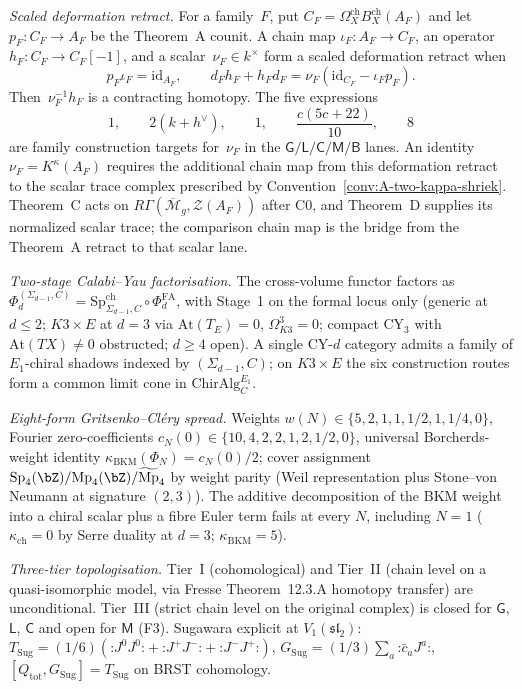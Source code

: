 \emph{Scaled deformation retract.}  For a family~$F$, put
$C_F=\Omega_X^{\mathrm{ch}}B_X^{\mathrm{ch}}(A_F)$ and let
$p_F\colon C_F\to A_F$ be the Theorem~A counit.  A chain map
$\iota_F\colon A_F\to C_F$, an operator
$h_F\colon C_F\to C_F[-1]$, and a scalar~$\nu_F\in k^\times$ form a
scaled deformation retract when
\[
 p_F\iota_F=\mathrm{id}_{A_F},
 \qquad
 d_Fh_F+h_Fd_F
 =\nu_F(\mathrm{id}_{C_F}-\iota_Fp_F).
\]
Then~$\nu_F^{-1}h_F$ is a contracting homotopy.  The five expressions
\[
 1,\qquad 2(k+h^\vee),\qquad 1,\qquad
 \frac{c(5c+22)}{10},\qquad 8
\]
are family construction targets for~$\nu_F$ in the
$\mathsf G/\mathsf L/\mathsf C/\mathsf M/\mathsf B$ lanes.  An identity
$\nu_F=K^\kappa(A_F)$ requires the additional chain map from this
deformation retract to the scalar trace complex prescribed by
Convention~\ref{conv:A-two-kappa-shriek}.  Theorem~C acts on
$R\Gamma(\overline{\mathcal M}_g,\mathcal Z(A_F))$ after C0, and
Theorem~D supplies its normalized scalar trace; the comparison chain
map is the bridge from the Theorem~A retract to that scalar lane.

\emph{Two-stage Calabi--Yau factorisation.} The cross-volume functor
factors as
$\Phi_d^{(\Sigma_{d-1},C)}
= \mathrm{Sp}^{\mathrm{ch}}_{\Sigma_{d-1},C}\circ\Phi^{\mathrm{FA}}_d$,
with Stage~1 on the formal locus only (generic at $d\le 2$;
$K3\times E$ at $d=3$ via $\mathrm{At}(T_E)=0$, $\Omega^3_{K3}=0$;
compact CY$_3$ with $\mathrm{At}(TX)\neq 0$ obstructed; $d\ge 4$
open). A single CY-$d$ category admits a family of $E_1$-chiral
shadows indexed by $(\Sigma_{d-1},C)$; on $K3\times E$ the six
construction routes form a common limit cone in
$\mathrm{ChirAlg}^{E_1}_C$.

\emph{Eight-form Gritsenko--Cl\'ery spread.} Weights
$w(N)\in\{5,2,1,1,1/2,1,1/4,0\}$, Fourier zero-coefficients
$c_N(0)\in\{10,4,2,2,1,2,1/2,0\}$, universal Borcherds-weight
identity $\kappa_{\mathrm{BKM}}(\Phi_N)=c_N(0)/2$; cover assignment
$\mathrm{Sp}_4(\bZ)/\mathrm{Mp}_4(\bZ)/\widetilde{\mathrm{Mp}}_4$ by
weight parity (Weil representation plus Stone--von Neumann at
signature $(2,3)$). The additive decomposition of the BKM weight
into a chiral scalar plus a fibre Euler term fails at every $N$,
including $N=1$ ($\kappa_{\mathrm{ch}}=0$ by Serre duality at
$d=3$; $\kappa_{\mathrm{BKM}}=5$).

\emph{Three-tier topologisation.} Tier~I (cohomological) and
Tier~II (chain level on a quasi-isomorphic model, via Fresse
Theorem~12.3.A homotopy transfer) are unconditional. Tier~III
(strict chain level on the original complex) is closed for
$\mathsf G$, $\mathsf L$, $\mathsf C$ and open for $\mathsf M$ (F3).
Sugawara explicit at $V_1(\mathfrak{sl}_2)$:
$T_{\mathrm{Sug}}=(1/6)(\mathord{:}J^0J^0\mathord{:}
+\mathord{:}J^+J^-\mathord{:}+\mathord{:}J^-J^+\mathord{:})$,
$G_{\mathrm{Sug}}=(1/3)\sum_a\mathord{:}\bar c_a J^a\mathord{:}$,
$[Q_{\mathrm{tot}},G_{\mathrm{Sug}}]=T_{\mathrm{Sug}}$ on BRST
cohomology.

